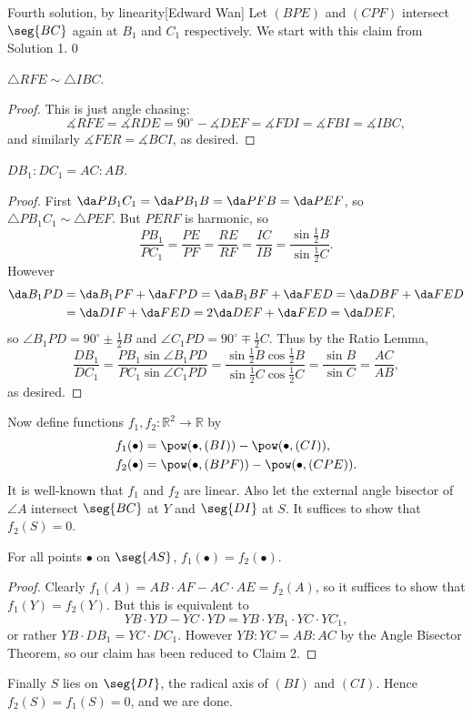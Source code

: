 \begin{customenv}{Fourth solution, by linearity}[Edward Wan]
    Let $(BPE)$ and $(CPF)$ intersect $\seg{BC}$ again at $B_1$ and $C_1$ respectively. We start with this claim from Solution 1.
    \setcounter{iclaim}0
    \begin{iclaim}
        $\triangle RFE\sim\triangle IBC$.
    \end{iclaim}
    \begin{proof}
        This is just angle chasing: \[\measuredangle RFE=\measuredangle RDE=90^\circ-\measuredangle DEF=\measuredangle FDI=\measuredangle FBI=\measuredangle IBC,\]
        and similarly $\measuredangle FER=\measuredangle BCI$, as desired.
    \end{proof}
    \begin{iclaim}
        $DB_1:DC_1=AC:AB$.
    \end{iclaim}
    \begin{proof}
        First $\da PB_1C_1=\da PB_1B=\da PFB=\da PEF$, so $\triangle PB_1C_1\sim\triangle PEF$. But $PERF$ is harmonic, so \[\frac{PB_1}{PC_1}=\frac{PE}{PF}=\frac{RE}{RF}=\frac{IC}{IB}=\frac{\sin\tfrac12B}{\sin\tfrac12C}.\]
        However
        \begin{align*}
            \da B_1PD&=\da B_1PF+\da FPD=\da B_1BF+\da FED=\da DBF+\da FED\\\ &=\da DIF+\da FED=2\da DEF+\da FED=\da DEF,
        \end{align*}
        so $\angle B_1PD=90^\circ\pm\tfrac12B$ and $\angle C_1PD=90^\circ\mp\tfrac12C$. Thus by the Ratio Lemma, \[\frac{DB_1}{DC_1}=\frac{PB_1\sin\angle B_1PD}{PC_1\sin\angle C_1PD}=\frac{\sin\tfrac12B\cos\tfrac12B}{\sin\tfrac12C\cos\tfrac12C}=\frac{\sin B}{\sin C}=\frac{AC}{AB},\]
        as desired.
    \end{proof}

    Now define functions $f_1,f_2:\mathbb R^2\to\mathbb R$ by
    \begin{align*}
        f_1(\bullet)&=\pow(\bullet,(BI))-\pow(\bullet,(CI)),\\
        f_2(\bullet)&=\pow(\bullet,(BPF))-\pow(\bullet,(CPE)).
    \end{align*}
    It is well-known that $f_1$ and $f_2$ are linear. Also let the external angle bisector of $\angle A$ intersect $\seg{BC}$ at $Y$ and $\seg{DI}$ at $S$. It suffices to show that $f_2(S)=0$.
    \begin{iclaim}
        For all points $\bullet$ on $\seg{AS}$, $f_1(\bullet)=f_2(\bullet)$.
    \end{iclaim}
    \begin{proof}
        Clearly $f_1(A)=AB\cdot AF-AC\cdot AE=f_2(A)$, so it suffices to show that $f_1(Y)=f_2(Y)$. But this is equivalent to \[YB\cdot YD-YC\cdot YD=YB\cdot YB_1\cdot YC\cdot YC_1,\]
        or rather $YB\cdot DB_1=YC\cdot DC_1$. However $YB:YC=AB:AC$ by the Angle Bisector Theorem, so our claim has been reduced to Claim 2.
    \end{proof}

    Finally $S$ lies on $\seg{DI}$, the radical axis of $(BI)$ and $(CI)$. Hence $f_2(S)=f_1(S)=0$, and we are done.
\end{customenv}
